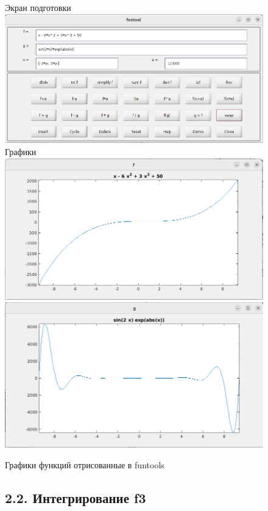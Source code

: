 \documentclass[12pt]{article}
\begin{document}
\begin{figure}[!h]
	\centering
	Экран подготовки
	\includegraphics[width=\linewidth]{funtool_setup.png}
	Графики
	\includegraphics[width=\linewidth]{funtool_f1.png}
    \includegraphics[width=\linewidth]{funtool_f2.png}
	\caption{Графики функций отрисованные в funtools}
\end{figure}



\begin{figure}[!h]
  \subsection*{2.2. Интегрирование f3}

	

 \end{figure}
 
\end{document}
